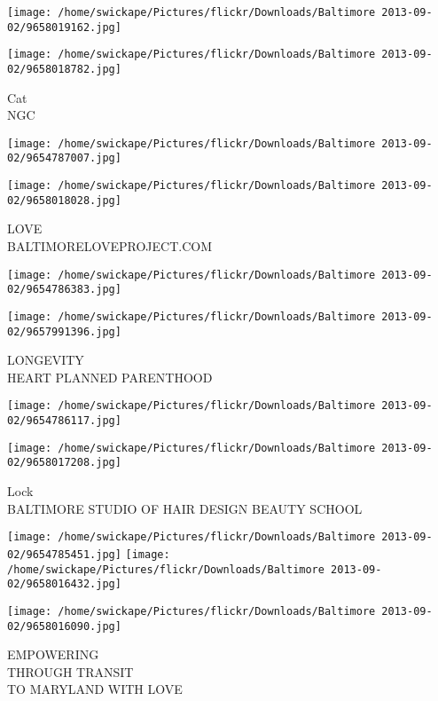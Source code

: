 \documentclass[10pt,letterpaper]{article}
\begin{document}
\texttt{[image: /home/swickape/Pictures/flickr/Downloads/Baltimore 2013-09-02/9658019162.jpg]}

\vspace{0.25in}
\texttt{[image: /home/swickape/Pictures/flickr/Downloads/Baltimore 2013-09-02/9658018782.jpg]}

Cat\\
NGC\\
\pagebreak

\texttt{[image: /home/swickape/Pictures/flickr/Downloads/Baltimore 2013-09-02/9654787007.jpg]}

\vspace{0.25in}
\texttt{[image: /home/swickape/Pictures/flickr/Downloads/Baltimore 2013-09-02/9658018028.jpg]}

LOVE\\
BALTIMORELOVEPROJECT.COM\\
\pagebreak

\texttt{[image: /home/swickape/Pictures/flickr/Downloads/Baltimore 2013-09-02/9654786383.jpg]}

\vspace{0.25in}
\texttt{[image: /home/swickape/Pictures/flickr/Downloads/Baltimore 2013-09-02/9657991396.jpg]}

LONGEVITY\\
HEART PLANNED PARENTHOOD\\
\pagebreak

\texttt{[image: /home/swickape/Pictures/flickr/Downloads/Baltimore 2013-09-02/9654786117.jpg]}

\vspace{0.25in}
\texttt{[image: /home/swickape/Pictures/flickr/Downloads/Baltimore 2013-09-02/9658017208.jpg]}

Lock\\
BALTIMORE STUDIO OF HAIR DESIGN BEAUTY SCHOOL\\
\pagebreak

\texttt{[image: /home/swickape/Pictures/flickr/Downloads/Baltimore 2013-09-02/9654785451.jpg]}
\texttt{[image: /home/swickape/Pictures/flickr/Downloads/Baltimore 2013-09-02/9658016432.jpg]}

\texttt{[image: /home/swickape/Pictures/flickr/Downloads/Baltimore 2013-09-02/9658016090.jpg]}

EMPOWERING\\
THROUGH TRANSIT\\
TO MARYLAND WITH LOVE\\
\pagebreak
\end{document}
